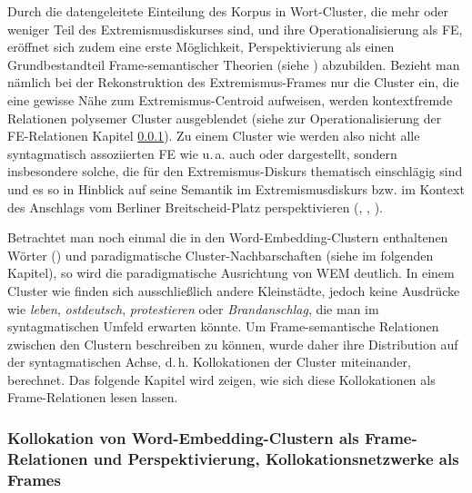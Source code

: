 Durch die datengeleitete Einteilung des Korpus in Wort-Cluster, die mehr oder weniger Teil des Extremismusdiskurses sind, und ihre Operationalisierung als FE, eröffnet sich zudem eine erste Möglichkeit, Perspektivierung als einen Grundbestandteil Frame-semantischer Theorien (siehe ) abzubilden. Bezieht man nämlich bei der Rekonstruktion des Extremismus-Frames nur die Cluster ein, die eine gewisse Nähe zum Extremismus-Centroid aufweisen, werden kontextfremde Relationen polysemer Cluster ausgeblendet (siehe zur Operationalisierung der FE-Relationen Kapitel \ref{kollokation-von-word-embedding-clustern-als-frame-relationen-und-perspektivierung-kollokationsnetzwerke-als-frames}). Zu einem Cluster wie  werden also nicht alle syntagmatisch assoziierten FE wie u.\,a. auch  oder  dargestellt, sondern insbesondere solche, die für den Extremismus-Diskurs thematisch einschlägig sind und es so in Hinblick auf seine Semantik im Extremismusdiskurs bzw. im Kontext des Anschlags vom Berliner Breitscheid-Platz perspektivieren (, , ).

Betrachtet man noch einmal die in den Word-Embedding-Clustern enthaltenen Wörter () und paradigmatische Cluster-Nachbarschaften (siehe  im folgenden Kapitel), so wird die paradigmatische Ausrichtung von WEM deutlich. In einem Cluster wie  finden sich ausschließlich andere Kleinstädte, jedoch keine Ausdrücke wie \emph{leben}, \emph{ostdeutsch}, \emph{protestieren} oder \emph{Brandanschlag}, die man im syntagmatischen Umfeld erwarten könnte. Um Frame-semantische Relationen zwischen den Clustern beschreiben zu können, wurde daher ihre Distribution auf der syntagmatischen Achse, d.\,h. Kollokationen der Cluster miteinander, berechnet. Das folgende Kapitel wird zeigen, wie sich diese Kollokationen als Frame-Relationen lesen lassen.

\subsubsection{Kollokation von Word-Embedding-Clustern als Frame-Relationen und Perspektivierung, Kollokationsnetzwerke als Frames}\label{kollokation-von-word-embedding-clustern-als-frame-relationen-und-perspektivierung-kollokationsnetzwerke-als-frames}

